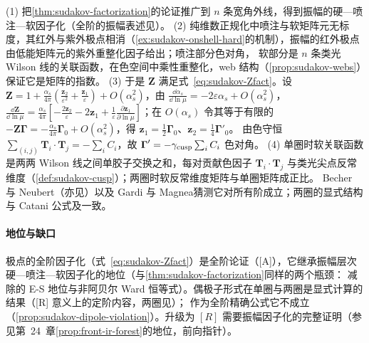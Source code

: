 \begin{proofsketch}
(1) 把\cref{thm:sudakov-factorization}的论证推广到 $n$ 条宽角外线，得到振幅的硬—喷注—软因子化\cite{Akhoury1979,Sen1983}（全阶的振幅表述见\cite{FeigeSchwartz2014,Ma2020}）。
(2) 纯维数正规化中喷注与软矩阵元无标度，其红外与紫外极点相消（\cref{ex:sudakov-onshell-hard}的机制），振幅的红外极点由低能矩阵元的紫外重整化因子给出；喷注部分色对角，
软部分是 $n$ 条类光 Wilson 线的关联函数，在色空间中乘性重整化，web 结构（\cref{prop:sudakov-webs}）保证它是矩阵的指数\cite{Becher:2009cu,Becher:2009qa,DixonMagneaSterman2008}。
(3) 于是 $\mathbf Z$ 满足式~\eqref{eq:sudakov-Zfact}。设 $\mathbf Z=1+\frac{\alpha_s}{4\pi}(\frac{\mathbf z_2}{\varepsilon^2}+\frac{\mathbf z_1}{\varepsilon})+O(\alpha_s^2)$，由 $\frac{\dd\alpha_s}{\dd\ln\mu}=-2\varepsilon\alpha_s+O(\alpha_s^2)$，
$\frac{\dd\mathbf Z}{\dd\ln\mu}=\frac{\alpha_s}{4\pi}[-\frac{2\mathbf z_2}{\varepsilon}-2\mathbf z_1+\frac1\varepsilon\frac{\partial\mathbf z_1}{\partial\ln\mu}]$；在 $O(\alpha_s)$ 令其等于有限的 $-\mathbf Z\boldsymbol\Gamma=-\frac{\alpha_s}{4\pi}\boldsymbol\Gamma_0+O(\alpha_s^2)$，得 $\mathbf z_1=\frac12\boldsymbol\Gamma_0$、$\mathbf z_2=\frac14\boldsymbol\Gamma'_0$。
由色守恒 $\sum_{(i,j)}\mathbf T_i\cdot\mathbf T_j=-\sum_iC_i$，故 $\boldsymbol\Gamma'=-\gamma_{\rm cusp}\sum_iC_i$ 色对角。
(4) 单圈时软关联函数是两两 Wilson 线之间单胶子交换之和，每对贡献色因子 $\mathbf T_i\cdot\mathbf T_j$ 与类光尖点反常维度（\cref{def:sudakov-cusp}）；两圈时软反常维度矩阵与单圈矩阵成正比\cite{Aybat:2006mz}。
Becher 与 Neubert\cite[式~(7)]{Becher:2009cu}（亦见\cite[式~(7)]{Becher:2009qa}）以及 Gardi 与 Magnea\cite{Gardi:2009qi}猜测它对所有阶成立；两圈的显式结构与 Catani 公式\cite{Catani:1998bh}及\cite{Sterman:2002qn}一致。
\end{proofsketch}

\paragraph{地位与缺口}极点的全阶因子化（式~\eqref{eq:sudakov-Zfact}）是全阶论证（[A]），它继承振幅层次硬—喷注—软因子化的地位（与\cref{thm:sudakov-factorization}同样的两个瓶颈：
减除的 E-S 地位与非阿贝尔 Ward 恒等式）。偶极子形式在单圈与两圈是显式计算的结果（[R] 意义上的定阶内容，两圈见\cite{Aybat:2006mz}）；
作为全阶精确公式它不成立（\cref{prop:sudakov-dipole-violation}）。升级为 $[R]$ 需要振幅因子化的完整证明（参见第~24~章\cref{prop:front-ir-forest}的地位，前向指针）。

